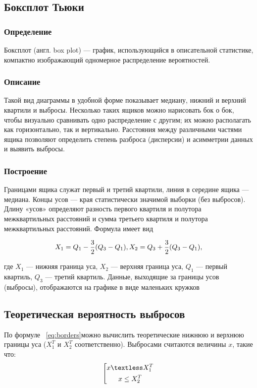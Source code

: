 \documentclass[12pt,a4paper]{scrartcl}
\begin{document}
\subsection{Боксплот Тьюки}
\subsubsection{Определение}

Боксплот (англ. box plot) — график, использующийся в описательной статистике, компактно изображающий одномерное распределение вероятностей.

\subsubsection{Описание}

Такой вид диаграммы в удобной форме показывает медиану, нижний и верхний квартили и выбросы. Несколько таких ящиков можно нарисовать бок
о бок, чтобы визуально сравнивать одно распределение с другим; их можно располагать как горизонтально, так и вертикально. Расстояния между
различными частями ящика позволяют определить степень разброса (дисперсии) и асимметрии данных и выявить выбросы.

\subsubsection{Построение}

Границами ящика служат первый и третий квартили, линия в середине
ящика — медиана. Концы усов — края статистически значимой выборки
(без выбросов). Длину «усов» определяют разность первого квартиля и полутора межквартильных расстояний и сумма третьего квартиля и полутора
межквартильных расстояний. Формула имеет вид

\begin{equation}\label{eq:borders}
\centering
X_1 = Q_1 - \frac{3}{2}(Q_3 - Q_1), X_2 = Q_3 + \frac{3}{2}(Q_3 - Q_1),
\end{equation}

где $X_1$ — нижняя граница уса, $X_2$ — верхняя граница уса, $Q_1$ — первый
квартиль, $Q_3$ — третий квартиль.
Данные, выходящие за границы усов (выбросы), отображаются на графике
в виде маленьких кружков

\subsection{Теоретическая вероятность выбросов}

По формуле ~\eqref{eq:borders}можно вычислить теоретические нижнюю и верхнюю границы уса
($X_1^T$ и $X_2^T$ соответственно).
Выбросами считаются величины $x$, такие что:
\begin{equation}\label{eq:emissions}
\centering
\left[ 
      \begin{gathered} 
       x \textless X_1^T \\
	  x \leq X_2^T \\
      \end{gathered} 
\right.
\end{equation}
\end{document}
